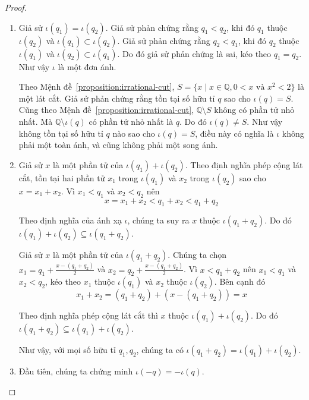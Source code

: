 \begin{proof}
    \begin{enumerate}[label={(\roman*)}]
        \item Giả sử $\iota(q_{1}) = \iota(q_{2})$. Giả sử phản chứng rằng $q_{1} < q_{2}$, khi đó $q_{1}$ thuộc $\iota(q_{2})$ và $\iota(q_{1})\subset \iota(q_{2})$. Giả sử phản chứng rằng $q_{2} < q_{1}$, khi đó $q_{2}$ thuộc $\iota(q_{1})$ và $\iota(q_{2})\subset \iota(q_{1})$. Do đó giả sử phản chứng là sai, kéo theo $q_{1} = q_{2}$. Như vậy $\iota$ là một đơn ánh.

              Theo Mệnh đề~\ref{proposition:irrational-cut}, $S = \{ x \mid x\in\mathbb{Q}, 0 < x \text{ và } x^{2} < 2 \}$ là một lát cắt. Giả sử phản chứng rằng tồn tại số hữu tỉ $q$ sao cho $\iota(q) = S$. Cũng theo Mệnh đề~\ref{proposition:irrational-cut}, $\mathbb{Q}\setminus S$ không có phần tử nhỏ nhất. Mà $\mathbb{Q}\setminus\iota(q)$ có phần tử nhỏ nhất là $q$. Do đó $\iota(q)\ne S$. Như vậy không tồn tại số hữu tỉ $q$ nào sao cho $\iota(q) = S$, điều này có nghĩa là $\iota$ không phải một toàn ánh, và cũng không phải một song ánh.

        \item Giả sử $x$ là một phần tử của $\iota(q_{1}) + \iota(q_{2})$. Theo định nghĩa phép cộng lát cắt, tồn tại hai phần tử $x_{1}$ trong $\iota(q_{1})$ và $x_{2}$ trong $\iota(q_{2})$ sao cho $x = x_{1} + x_{2}$. Vì $x_{1} < q_{1}$ và $x_{2} < q_{2}$ nên
              \[
                  x = x_{1} + x_{2} < q_{1} + x_{2} < q_{1} + q_{2}
              \]

              Theo định nghĩa của ánh xạ $\iota$, chúng ta suy ra $x$ thuộc $\iota(q_{1} + q_{2})$. Do đó $ \iota(q_{1}) + \iota(q_{2}) \subseteq \iota(q_{1} + q_{2})$.

              Giả sử $x$ là một phần tử của $\iota(q_{1} + q_{2})$. Chúng ta chọn $x_{1} = q_{1} + \frac{x - (q_{1} + q_{2})}{2}$ và $x_{2} = q_{2} + \frac{x - (q_{1} + q_{2})}{2}$. Vì $x < q_{1} + q_{2}$ nên $x_{1} < q_{1}$ và $x_{2} < q_{2}$, kéo theo $x_{1}$ thuộc $\iota(q_{1})$ và $x_{2}$ thuộc $\iota(q_{2})$. Bên cạnh đó
              \[
                  x_{1} + x_{2} = (q_{1} + q_{2}) + (x - (q_{1} + q_{2})) = x
              \]

              Theo định nghĩa phép cộng lát cắt thì $x$ thuộc $\iota(q_{1}) + \iota(q_{2})$. Do đó $\iota(q_{1} + q_{2}) \subseteq \iota(q_{1}) + \iota(q_{2})$.

              Như vậy, với mọi số hữu tỉ $q_{1}, q_{2}$, chúng ta có $ \iota(q_{1} + q_{2}) = \iota(q_{1}) + \iota(q_{2})$.
        \item Đầu tiên, chúng ta chứng minh $\iota(-q) = -\iota(q)$.


\end{enumerate}
\end{proof}
